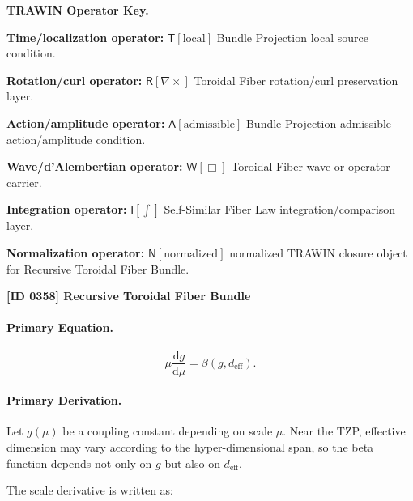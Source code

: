 \par\vspace{0.45\baselineskip}
\noindent\begin{minipage}[t]{\linewidth}
\begingroup
\small
\raggedright
\textbf{TRAWIN Operator Key.}\par
\noindent\textbf{Time/localization operator:} $\mathsf{T}\!\left[\mathrm{local}\right]$ Bundle Projection local source condition.\par
\noindent\textbf{Rotation/curl operator:} $\mathsf{R}\!\left[\nabla\times\right]$ Toroidal Fiber rotation/curl preservation layer.\par
\noindent\textbf{Action/amplitude operator:} $\mathsf{A}\!\left[\mathrm{admissible}\right]$ Bundle Projection admissible action/amplitude condition.\par
\noindent\textbf{Wave/d'Alembertian operator:} $\mathsf{W}\!\left[\Box\right]$ Toroidal Fiber wave or operator carrier.\par
\noindent\textbf{Integration operator:} $\mathsf{I}\!\left[\int\right]$ Self-Similar Fiber Law integration/comparison layer.\par
\noindent\textbf{Normalization operator:} $\mathsf{N}\!\left[\mathrm{normalized}\right]$ normalized TRAWIN closure object for Recursive Toroidal Fiber Bundle.\par
\endgroup
\end{minipage}

\clearpage
\noindent\textbf{[ID 0358] Recursive Toroidal Fiber Bundle}\par
\vspace{0.35em}
\paragraph{Primary Equation.}
\begin{equation}
\mu\frac{\mathrm{d}g}{\mathrm{d}\mu}
=
\beta(g,d_{\mathrm{eff}}).
\end{equation}

\paragraph{Primary Derivation.}
Let $g(\mu)$ be a coupling constant depending on scale $\mu$.  
Near the TZP, effective dimension may vary according to the hyper-dimensional span, so the beta function depends not only on $g$ but also on $d_{\mathrm{eff}}$.

The scale derivative is written as:

